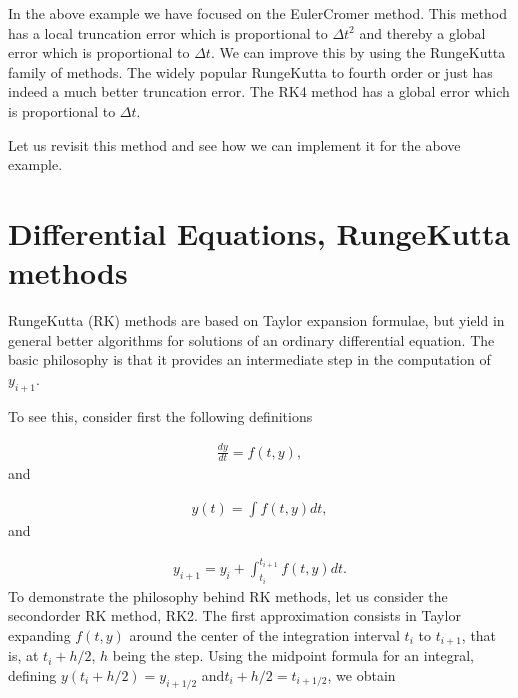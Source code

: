 \documentclass[letterpaper,10pt,english]{sphinxmanual}
\begin{document}
In the above example we have focused on the Euler\sphinxhyphen{}Cromer method. This
method has a local truncation error which is proportional to \(\Delta t^2\)
and thereby a global error which is proportional to \(\Delta t\).
We can improve this by using the Runge\sphinxhyphen{}Kutta family of
methods. The widely popular Runge\sphinxhyphen{}Kutta to fourth order or just 
has indeed a much better truncation error. The RK4 method has a global
error which is proportional to \(\Delta t\).

Let us revisit this method and see how we can implement it for the above example.


\section{Differential Equations, Runge\sphinxhyphen{}Kutta methods}
\label{\detokenize{chapter1:differential-equations-runge-kutta-methods}}
Runge\sphinxhyphen{}Kutta (RK) methods are based on Taylor expansion formulae, but yield
in general better algorithms for solutions of an ordinary differential equation.
The basic philosophy is that it provides an intermediate step in the computation of \(y_{i+1}\).

To see this, consider first the following definitions




\begin{equation*}
\begin{split}
\begin{equation}
\frac{dy}{dt}=f(t,y),  
\label{_auto52} \tag{71}
\end{equation}
\end{split}
\end{equation*}
and




\begin{equation*}
\begin{split}
\begin{equation}
y(t)=\int f(t,y) dt,  
\label{_auto53} \tag{72}
\end{equation}
\end{split}
\end{equation*}
and




\begin{equation*}
\begin{split}
\begin{equation}
y_{i+1}=y_i+ \int_{t_i}^{t_{i+1}} f(t,y) dt.
\label{_auto54} \tag{73}
\end{equation}
\end{split}
\end{equation*}
To demonstrate the philosophy behind RK methods, let us consider
the second\sphinxhyphen{}order RK method, RK2.
The first approximation consists in Taylor expanding \(f(t,y)\)
around the center of the integration interval \(t_i\) to \(t_{i+1}\),
that is, at \(t_i+h/2\), \(h\) being the step.
Using the midpoint formula for an integral,
defining \(y(t_i+h/2) = y_{i+1/2}\) and\(t_i+h/2 = t_{i+1/2}\), we obtain
\end{document}
